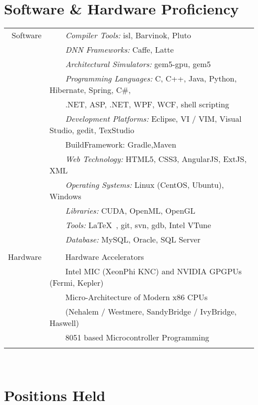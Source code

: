 \documentclass[a4paper,10pt]{article} %
\newcommand{\tabitem}{~~\llap{\textbullet}~~}
\begin{document}
\section{Software \& Hardware Proficiency}
\begin{tabular}{rl}
Software & \tabitem \textit{Compiler Tools:} isl, Barvinok, Pluto\\
& \tabitem \textit{DNN Frameworks:} Caffe, Latte\\
& \tabitem \textit{Architectural Simulators:} gem5-gpu, gem5\\
& \tabitem \textit{Programming Languages:} C, C++, Java, Python, Hibernate, Spring, C\#,\\
& ~~~~.NET, ASP, .NET, WPF, WCF, shell scripting\\
& \tabitem \textit{Development Platforms:} Eclipse, VI / VIM, Visual Studio, gedit, TexStudio\\
& \tabitem{BuildFramework:} Gradle,Maven \\
& \tabitem \textit{Web Technology:} HTML5, CSS3, AngularJS, ExtJS, XML\\
& \tabitem \textit{Operating Systems:} Linux (CentOS, Ubuntu), Windows \\
& \tabitem \textit{Libraries:} CUDA, OpenML, OpenGL  \\
& \tabitem \textit{Tools:} \LaTeX\ , git, svn, gdb, Intel VTune\\
& \tabitem \textit{Database:} MySQL, Oracle, SQL Server\\

&\\

Hardware  & \tabitem Hardware Accelerators \\
& ~~~~Intel MIC (XeonPhi KNC) and NVIDIA GPGPUs (Fermi, Kepler) \\
& \tabitem Micro-Architecture of Modern x86 CPUs\\
& ~~~~(Nehalem / Westmere, SandyBridge / IvyBridge, Haswell) \\ 
& \tabitem 8051 based Microcontroller Programming \\
&\\
\end{tabular}
\\

\section{Positions Held}
\end{document}
